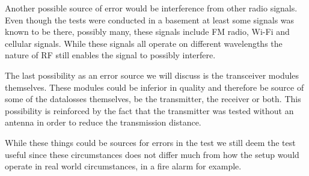 Another possible source of error would be interference from other radio signals. 
Even though the tests were conducted in a basement at least some signals was known to be there, possibly many, these signals include FM radio, Wi-Fi and cellular signals.
While these signals all operate on different wavelengths the nature of RF still enables the signal to possibly interfere.

The last possibility as an error source we will discuss is the transceiver modules themselves.
These modules could be inferior in quality and therefore be source of some of the datalosses themselves, be the transmitter, the receiver or both.
This possibility is reinforced by the fact that the transmitter was tested without an antenna in order to reduce the transmission distance.

While these things could be sources for errors in the test we still deem the test useful since these circumstances does not differ much from how the setup would operate in real world circumstances, in a fire alarm for example.